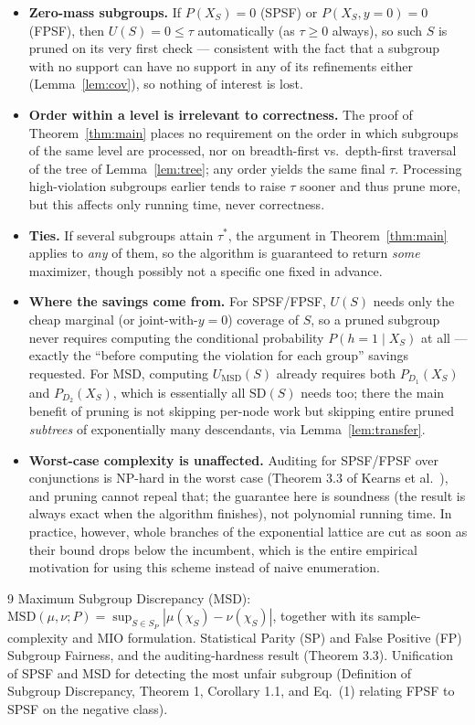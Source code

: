 \documentclass[11pt]{article}
\begin{document}
\begin{itemize}
\item \textbf{Zero-mass subgroups.} If $P(X_S)=0$ (SPSF) or $P(X_S,y=0)=0$ (FPSF),
then $U(S)=0\le\tau$ automatically (as $\tau\ge0$ always), so such $S$ is pruned on
its very first check — consistent with the fact that a subgroup with no support can
have no support in any of its refinements either (Lemma~\ref{lem:cov}), so nothing of
interest is lost.
\item \textbf{Order within a level is irrelevant to correctness.} The proof of
Theorem~\ref{thm:main} places no requirement on the order in which subgroups of the
same level are processed, nor on breadth-first vs.\ depth-first traversal of the tree
of Lemma~\ref{lem:tree}; any order yields the same final $\tau$. Processing
high-violation subgroups earlier tends to raise $\tau$ sooner and thus prune more, but
this affects only running time, never correctness.
\item \textbf{Ties.} If several subgroups attain $\tau^\ast$, the argument in
Theorem~\ref{thm:main} applies to \emph{any} of them, so the algorithm is guaranteed to
return \emph{some} maximizer, though possibly not a specific one fixed in advance.
\item \textbf{Where the savings come from.} For SPSF/FPSF, $U(S)$ needs only the cheap
marginal (or joint-with-$y{=}0$) coverage of $S$, so a pruned subgroup never requires
computing the conditional probability $P(h=1\mid X_S)$ at all — exactly the ``before
computing the violation for each group'' savings requested. For MSD, computing
$U_{\mathrm{MSD}}(S)$ already requires both $P_{D_1}(X_S)$ and $P_{D_2}(X_S)$, which is
essentially all $\mathrm{SD}(S)$ needs too; there the main benefit of pruning is not
skipping per-node work but skipping entire pruned \emph{subtrees} of exponentially many
descendants, via Lemma~\ref{lem:transfer}.
\item \textbf{Worst-case complexity is unaffected.} Auditing for SPSF/FPSF over
conjunctions is NP-hard in the worst case (Theorem 3.3 of Kearns et al.\
\cite{kearns18}), and pruning cannot repeal that; the guarantee here is soundness
(the result is always exact when the algorithm finishes), not polynomial running time.
In practice, however, whole branches of the exponential lattice are cut as soon as
their bound drops below the incumbent, which is the entire empirical motivation for
using this scheme instead of naive enumeration.
\end{itemize}

\begin{thebibliography}{9}
 Maximum Subgroup Discrepancy (MSD): $\mathrm{MSD}(\mu,\nu;P)=\sup_{S\in
S_P}|\mu(\chi_S)-\nu(\chi_S)|$, together with its sample-complexity and MIO
formulation.
 Statistical Parity (SP) and False Positive (FP) Subgroup Fairness,
and the auditing-hardness result (Theorem 3.3).
 Unification of SPSF and MSD for detecting the most unfair subgroup
(Definition of Subgroup Discrepancy, Theorem 1, Corollary 1.1, and Eq.~(1) relating
FPSF to SPSF on the negative class).
\end{thebibliography}
\end{document}
